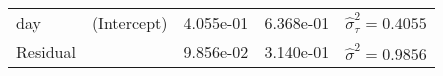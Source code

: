 \documentclass[12pt,]{article}
\begin{document}
\begin{longtable}[]{@{}lllll@{}}
\begin{minipage}[t]{0.10\columnwidth}\raggedright
day\strut
\end{minipage} & \begin{minipage}[t]{0.13\columnwidth}\raggedright
(Intercept)\strut
\end{minipage} & \begin{minipage}[t]{0.11\columnwidth}\raggedright
4.055e-01\strut
\end{minipage} & \begin{minipage}[t]{0.11\columnwidth}\raggedright
6.368e-01\strut
\end{minipage} & \begin{minipage}[t]{0.40\columnwidth}\raggedright
\(\hat\sigma^2_{\tau}=0.4055\)\strut
\end{minipage}\tabularnewline
\begin{minipage}[t]{0.10\columnwidth}\raggedright
Residual\strut
\end{minipage} & \begin{minipage}[t]{0.13\columnwidth}\raggedright
\strut
\end{minipage} & \begin{minipage}[t]{0.11\columnwidth}\raggedright
9.856e-02\strut
\end{minipage} & \begin{minipage}[t]{0.11\columnwidth}\raggedright
3.140e-01\strut
\end{minipage} & \begin{minipage}[t]{0.40\columnwidth}\raggedright
\(\hat\sigma^2=0.9856\)\strut
\end{minipage}\tabularnewline
\bottomrule
\end{longtable}
\end{document}
